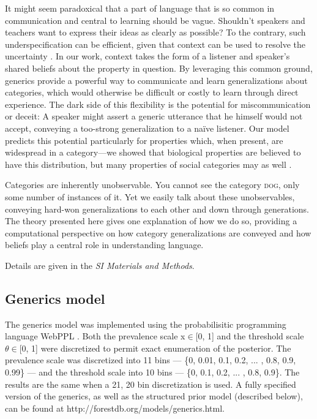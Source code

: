 \documentclass{pnastwo}
\begin{document}
\begin{article}
It might seem paradoxical that a part of language that is so common in communication and central to learning should be vague. 
Shouldn't speakers and teachers want to express their ideas as clearly as possible?
To the contrary, such underspecification can be efficient, given that context can be used to resolve the uncertainty \cite{Piantadosi2012}.
In our work, context takes the form of a listener and speaker's shared beliefs about the property in question. 
By leveraging this common ground, generics provide a powerful way to communicate and learn generalizations about categories, 
which would otherwise be difficult or costly to learn through direct experience.
The dark side of this flexibility is the potential for miscommunication or deceit: A speaker might assert a generic utterance that he himself would not accept, conveying a too-strong generalization to a na\"{i}ve listener.  
Our model predicts this potential particularly for properties which, when present, are widespread in a category---we showed that biological properties are believed to have this distribution, but many properties of social categories may as well \cite{Cimpian2011a,Cimpian2012b,Rhodes2012}.


Categories are inherently unobservable. 
You cannot see the category \textsc{dog}, only some number of instances of it.
Yet we easily talk about these unobservables, conveying hard-won generalizations to each other and down through generations.
The theory presented here gives one explanation of how we do so, providing a computational perspective on how category generalizations are conveyed and how beliefs play a central role in understanding language.







\begin{materials}
Details are given in the {\it SI Materials and Methods}.


\subsection{Generics model}
The generics model was implemented using the probabilisitic programming language WebPPL \cite{dippl}. 
Both the prevalence scale x$\in$[0, 1]  and the threshold scale $\theta \in$[0, 1] were discretized to permit exact enumeration of the posterior.
The prevalence scale was discretized into 11 bins --- \{0, 0.01, 0.1, 0.2, ... , 0.8, 0.9, 0.99\} --- and the threshold scale into 10 bins ---  \{0, 0.1, 0.2, ... , 0.8, 0.9\}. 
The results are the same when a 21, 20 bin discretization is used. 
A fully specified version of the generics, as well as the structured prior model (described below), can be found at http://forestdb.org/models/generics.html. 



\end{materials}
\end{article}
\end{document}
